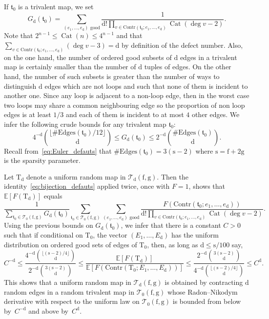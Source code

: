 \documentclass[JEP,XML,SOM,Unicode,NoFloatCountersInSection,NoEqCountersInSection]{cedram}
\DeclareMathOperator{\Cat}{Cat}
\theoremstyle{plain}
\theoremstyle{definition}
\theoremstyle{remark}
\newcommand{\E}{\mathbb{E}}
\newcommand{\Triv}{\mathrm{T}}
\newcommand{\face}{\mathrm{f}}
\newcommand{\defect}{\mathrm{d}}
\newcommand{\gen}{\mathrm{g}}
\newcommand{\spar}{\mathrm{s}}
\begin{document}
If $\mathfrak{t}_0$ is a trivalent map, we set
\[
G_\defect(\mathfrak{t}_0) = \sum_{(e_1, \dots, e_{\defect}) \text{ good}} \frac{1}{\defect! \prod_{v \in \mathrm{Contr}(\mathfrak{t}_0 ; e_1, \dots, e_{\defect})} \Cat(\deg v - 2)}.
\]
Note that $2^{n-1} \le \Cat(n) \le 4^{n-1}$ and that $\sum_{v \in \mathrm{Contr}(\mathfrak{t}_0 ; e_1, \dots, e_{\defect})} (\deg v - 3) = \defect$ by definition of the defect number. Also, on the one hand, the number of ordered good subsets of $\defect$ edges in a trivalent map is certainly smaller than the number of $\defect$ tuples of edges.
On the other hand, the number of such subsets is greater than the number of ways to distinguish $\defect$ edges which are not loops and such that none of them is incident to another one. Since any loop is adjacent to a non-loop edge, then in the worst case two loops may share a common neighbouring edge so the proportion of non loop edges is at least $1/3$ and each of them is incident to at most $4$ other edges.
We infer the following crude bounds for any trivalent map $\mathfrak{t}_0$:
\[
4^{-\defect} \binom{\lfloor \#\mathrm{Edges}(\mathfrak{t}_0)/12\rfloor}{\defect} \le G_\defect(\mathfrak{t}_0) \le 2^{-\defect} \binom{\#\mathrm{Edges}(\mathfrak{t}_0)}{\defect}.
\]
Recall from~\eqref{eq:Euler_defauts} that $\#\mathrm{Edges}(\mathfrak{t}_0) = 3(\spar-2)$ where $\spar = \face+2\gen$ is the sparsity parameter.

Let $\Triv_\defect$ denote a uniform random map in $\mathcal{T}_{\defect}(\face,\gen)$. Then the identity~\eqref{eq:bijection_defauts} applied twice, once with $F=1$, shows that $\E[F(\Triv_{ \defect})]$ equals
\[
\frac{1}{\sum_{\mathfrak{t}_0 \in \mathcal{T}_0(\face, \gen)} G_\defect(\mathfrak{t}_0)} \sum_{\mathfrak{t}_0 \in \mathcal{T}_0(\face, \gen)} \sum_{(e_1, \dots, e_\defect) \text{ good}} \frac{F(\mathrm{Contr}(\mathfrak{t}_0 ; e_1, \dots, e_\defect))}{\defect! \prod_{v \in \mathrm{Contr}(\mathfrak{t}_0 ; e_1, \dots, e_\defect)} \Cat(\deg v - 2)}.
\]
Using the previous bounds on $G_\defect(\mathfrak{t}_0)$, we infer that there is a constant $C>0$ such that if conditional on $\Triv_0$, the vector $(E_1, \dots, E_\defect)$ has the uniform distribution on ordered good sets of edges of $\Triv_0$, then, as long as $ \defect \le \spar/100$ say,
\begin{equation} \label{eq:RNexp}
C^{-\defect}
\le \frac{4^{-\defect} \binom{\lfloor (\spar-2)/4\rfloor}{\defect}}{2^{-\defect} \binom{3 (\spar-2)}{\defect}}
\le \frac{\E[F(\Triv_{ \defect})]}{\E[F(\mathrm{Contr}(\Triv_0 ; E_1, \dots, E_\defect))]}
\le \frac{2^{-\defect} \binom{3 (\spar-2)}{\defect}}{4^{-\defect} \binom{\lfloor (\spar-2)/4\rfloor}{\defect}}
\le C^\defect.
\end{equation}
This shows that a uniform random map in $\mathcal{T}_{\defect}(\face,\gen)$ is obtained by contracting $ \defect$ random edges in a random trivalent map in $\mathcal{T}_{0}(\face, \gen)$ whose Radon--Nikodym derivative with respect to the uniform law on $\mathcal{T}_{0}(\face, \gen)$ is bounded from below by~$C^{- \defect}$ and above by~$C^{ \defect}$.
\end{document}
